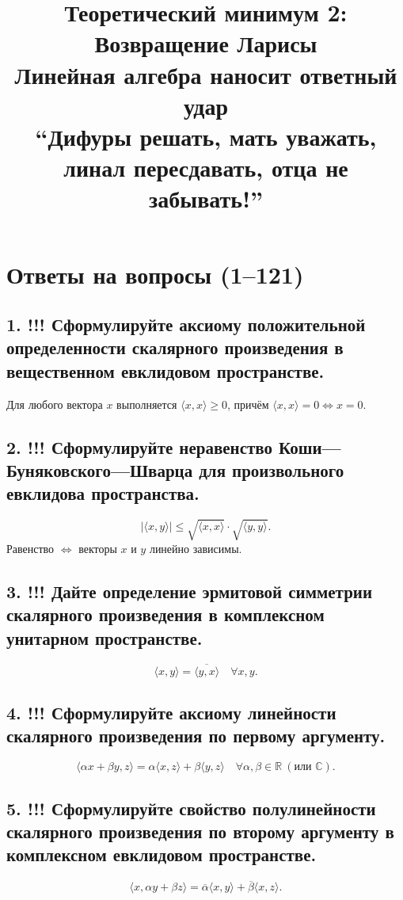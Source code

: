 \documentclass[a4paper,12pt]{article}
\title{%
  Теоретический минимум 2: Возвращение Ларисы \\
  Линейная алгебра наносит ответный удар \\[2ex]
  \large \enquote{Дифуры решать, мать уважать, \\ линал пересдавать, отца не забывать!}%
}
\author{
}
\date{}
\begin{document}
\maketitle
\newpage

\section*{Ответы на вопросы (1--121)}


\subsection*{1. !!! Сформулируйте аксиому положительной определенности скалярного произведения в вещественном евклидовом пространстве.}
Для любого вектора \(x\) выполняется \(\langle x, x \rangle \ge 0\), причём \(\langle x, x \rangle = 0 \iff x = 0\).

\subsection*{2. !!! Сформулируйте неравенство Коши—Буняковского—Шварца для произвольного евклидова пространства.}
\[ |\langle x, y \rangle| \le \sqrt{\langle x, x \rangle} \cdot \sqrt{\langle y, y \rangle}. \]
Равенство \(\iff\) векторы \(x\) и \(y\) линейно зависимы.

\subsection*{3. !!! Дайте определение эрмитовой симметрии скалярного произведения в комплексном унитарном пространстве.}
\[ \langle x, y \rangle = \overline{\langle y, x \rangle} \quad \forall x, y. \]

\subsection*{4. !!! Сформулируйте аксиому линейности скалярного произведения по первому аргументу.}
\[ \langle \alpha x + \beta y, z \rangle = \alpha \langle x, z \rangle + \beta \langle y, z \rangle \quad \forall \alpha, \beta \in \mathbb{R} \ (\text{или } \mathbb{C}). \]

\subsection*{5. !!! Сформулируйте свойство полулинейности скалярного произведения по второму аргументу в комплексном евклидовом пространстве.}
\[ \langle x, \alpha y + \beta z \rangle = \overline{\alpha} \langle x, y \rangle + \overline{\beta} \langle x, z \rangle. \]
\end{document}
